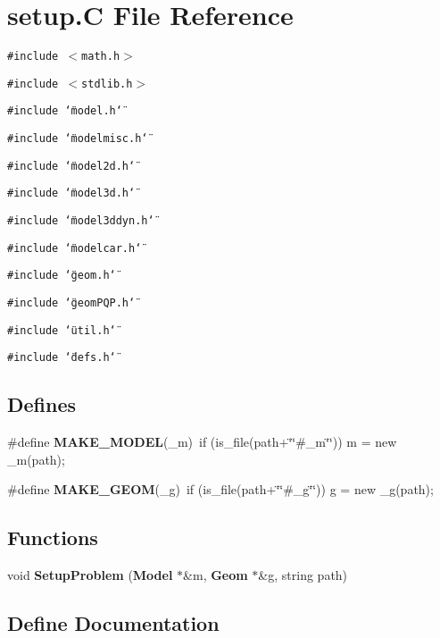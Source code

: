 \section{setup.C File Reference}
\label{setup_8C}
{\tt \#include $<$math.h$>$}\par
{\tt \#include $<$stdlib.h$>$}\par
{\tt \#include \char`\"{}model.h\char`\"{}}\par
{\tt \#include \char`\"{}modelmisc.h\char`\"{}}\par
{\tt \#include \char`\"{}model2d.h\char`\"{}}\par
{\tt \#include \char`\"{}model3d.h\char`\"{}}\par
{\tt \#include \char`\"{}model3ddyn.h\char`\"{}}\par
{\tt \#include \char`\"{}modelcar.h\char`\"{}}\par
{\tt \#include \char`\"{}geom.h\char`\"{}}\par
{\tt \#include \char`\"{}geom\-PQP.h\char`\"{}}\par
{\tt \#include \char`\"{}util.h\char`\"{}}\par
{\tt \#include \char`\"{}defs.h\char`\"{}}\par
\subsection*{Defines}
\begin{CompactItemize}
\item 
\#define {\bf MAKE\_\-MODEL}(\_\-m)\ if (is\_\-file(path+\char`\"{}\char`\"{}\#\_\-m\char`\"{}\char`\"{})) m = new \_\-m(path);
\item 
\#define {\bf MAKE\_\-GEOM}(\_\-g)\ if (is\_\-file(path+\char`\"{}\char`\"{}\#\_\-g\char`\"{}\char`\"{})) g = new \_\-g(path);
\end{CompactItemize}
\subsection*{Functions}
\begin{CompactItemize}
\item 
void {\bf Setup\-Problem} ({\bf Model} $\ast$\&m, {\bf Geom} $\ast$\&g, string path)
\end{CompactItemize}


\subsection{Define Documentation}

